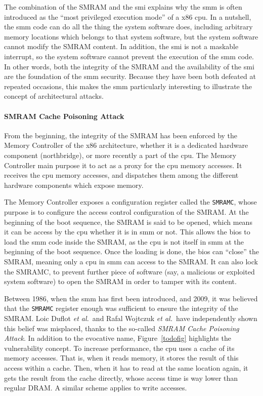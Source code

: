 The combination of the SMRAM and the \ac{smi} explains why the \ac{smm} is often
introduced as the ``most privileged execution mode'' of a x86 \ac{cpu}.
%
In a nutshell, the \ac{smm} code can do all the thing the system software does,
including arbitrary memory locations which belongs to that system software, but
the system software cannot modify the SMRAM content.
%
In addition, the \ac{smi} is not a maskable interrupt, so the system software
cannot prevent the execution of the \ac{smm} code.
%
In other words, both the integrity of the SMRAM and the availability of the
\ac{smi} are the foundation of the \ac{smm} security.
%
Because they have been both defeated at repeated occasions, this makes the
\ac{smm} particularly interesting to illustrate the concept of architectural
attacks.

\paragraph{SMRAM Cache Poisoning Attack}
%
From the beginning, the integrity of the SMRAM has been enforced by the Memory
Controller of the x86 architecture, whether it is a dedicated hardware component
(northbridge), or more recently a part of the \ac{cpu}.
%
The Memory Controller main purpose it to act as a proxy for the \ac{cpu} memory
accesses.
%
It receives the \ac{cpu} memory accesses, and dispatches them among the
different hardware components which expose memory.

The Memory Controller exposes a configuration register called the
\texttt{SMRAMC}, whose purpose is to configure the access control configuration
of the SMRAM.
%
At the beginning of the boot sequence, the SMRAM is said to be opened, which
means it can be access by the \ac{cpu} whether it is in \ac{smm} or not.
%
This allows the \ac{bios} to load the \ac{smm} code inside the SMRAM, as the
\ac{cpu} is not itself in \ac{smm} at the beginning of the boot sequence.
%
Once the loading is done, the \ac{bios} can ``close'' the SMRAM, meaning only a
\ac{cpu} in \ac{smm} can access to the SMRAM.
%
It can also lock the SMRAMC, to prevent further piece of software (say, a
malicious or exploited system software) to open the SMRAM in order to tamper
with its content.

Between 1986, when the \ac{smm} has first been
introduced, and 2009, it was believed that the \texttt{SMRAMC} register enough
was sufficient to ensure the integrity of the SMRAM.
%
Loic Duflot \emph{et al.}\,\cite{duflot2009smram} and Rafal Wojtczuk \emph{et
  al.}\,\cite{wojtczuk2009smram} have independently shown this belief was
misplaced, thanks to the so-called \emph{SMRAM Cache Poisoning Attack}.
%
In addition to the evocative name, Figure~\ref{todofig} highlights the
vulnerability concept.
%
To increase performance, the \ac{cpu} uses a cache of its memory accesses.
%
That is, when it reads memory, it stores the result of this access within a
cache.
%
Then, when it has to read at the same location again, it gets the result from
the cache directly, whose access time is way lower than regular DRAM.
%
A similar scheme applies to write accesses.

